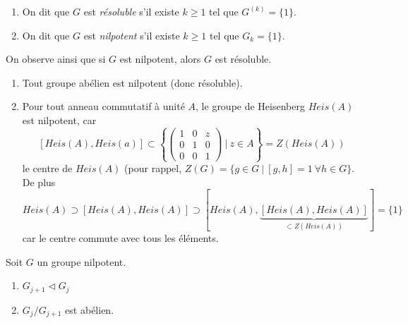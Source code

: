     \begin{defi}
      \begin{enumerate}
      \item On dit que $G$ est \emph{résoluble}  s'il existe $k \geq 1$ tel que
        $G^{(k)} = \{1\}$.

      \item On dit que $G$ est \emph{nilpotent}  s'il existe $k \geq 1$ tel que $G_k = \{1\}$.
      \end{enumerate}
    \end{defi}


    On observe ainsi que si $G$ est nilpotent, alors $G$ est résoluble.

    \begin{exs}
      \begin{enumerate}
      \item Tout groupe abélien est nilpotent (donc résoluble).

        \begin{center}
        \end{center}

      \item Pour tout anneau commutatif à unité $A$, le groupe de Heisenberg $Heis(A)$ est nilpotent, car 
          \[[Heis(A), Heis(a)] \subset \left\{
            \begin{pmatrix}
              1 & 0 & z\\ 0 & 1 & 0\\ 0 & 0 & 1
            \end{pmatrix}\ \big|\ z\in A \right\} = Z(Heis(A))
          \]
        le centre de $Heis(A)$ (pour rappel, $Z(G) = \{g \in G\ |\ [g,h] = 1\ \forall h \in G\}$. De plus
          \[Heis(A) \supset [Heis(A), Heis(A)] \supset [Heis(A), \underbrace{[Heis(A), Heis(A)]}_{\subset
            Z(Heis(A))}] = \{1\}\]
        car le centre commute avec tous les éléments.
      \end{enumerate}
    \end{exs}

    \begin{prop}
      Soit $G$ un groupe nilpotent.
      \begin{enumerate}
      \item $G_{j+1} \lhd G_j$
      \item $G_j/G_{j+1}$ est abélien.
      \end{enumerate}
    \end{prop}
    

